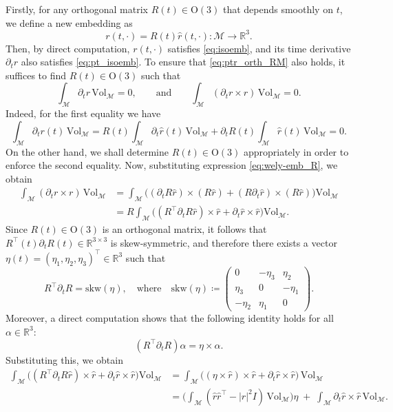 \documentclass[11pt,a4paper,oneside,reqno]{amsart}
\theoremstyle{definition}
\theoremstyle{plain}
\numberwithin{theorem}{section}
\numberwithin{proposition}{section}
\numberwithin{lemma}{section}
\numberwithin{equation}{section}
\newcommand{\Man}{\mathcal{M}}
\newcommand{\Vol}{\mathrm{Vol}}
\begin{document}
Firstly, for any orthogonal matrix $R(t) \in \mathrm{O}(3)$ that depends smoothly on $t$, we define a new embedding as
\begin{equation}\label{eq:wely-emb_R} 
    r(t,\cdot) = R(t)\hat r(t,\cdot) : \Man \to \mathbb{R}^3.
\end{equation} 
Then, by direct computation, $r(t,\cdot)$ satisfies \eqref{eq:isoemb}, and its time derivative $\partial_t r$ also satisfies \eqref{eq:pt_isoemb}.
To ensure that \eqref{eq:ptr_orth_RM} also holds, it suffices to find 
$R(t) \in \mathrm{O}(3)$ such that
\[
    \int_{\Man} \partial_t r \,\Vol_{\Man} = 0,
    \qquad\text{and}\qquad
    \int_{\Man} (\partial_t r \times r)\,\Vol_{\Man} = 0.
\]
Indeed, for the first equality we have 
    \[ \int_{\Man}\partial_t r(t)\,\Vol_{\Man} 
    = R(t) \int_{\Man}  \partial_t \hat r(t)\,\Vol_{\Man} + 
     \partial_t R(t) \int_{\Man}  \hat r(t)\,\Vol_{\Man} = 0. \]
On the other hand, we shall determine $R(t) \in \mathrm{O}(3)$ appropriately in order to enforce the second equality. Now, substituting expression \eqref{eq:wely-emb_R}, we obtain 
\[ \begin{aligned}
    \int_{\Man} (\partial_t r \times r)\,\Vol_{\Man} &= 
    \int_{\Man} \big( (\partial_t R \hat r) \times (R \hat r) + 
    (R \partial_t \hat r) \times (R \hat r)
    \big) \Vol_{\Man} \\ 
    &= R \int_{\Man}((R^{\top}\partial_t R \hat{r} ) \times  \hat{r} + 
    \partial_t \hat r \times \hat{r}    
    \big) \Vol_{\Man}.  
\end{aligned} \]
Since $R(t) \in \mathrm{O}(3)$ is an orthogonal matrix, it follows that 
$R^{\top}(t)\partial_t R(t) \in \mathbb{R}^{3\times 3}$ is skew-symmetric, and therefore 
there exists a vector $\eta(t) = (\eta_1, \eta_2, \eta_3)^{\top} \in \mathbb{R}^3$ such that
\[
    R^{\top}\partial_t R = \mathrm{skw}(\eta), 
    \quad \text{where} \quad
    \mathrm{skw}(\eta) \coloneqq
    \begin{pmatrix}
        0 & -\eta_3 & \eta_2 \\
        \eta_3 & 0 & -\eta_1 \\
        -\eta_2 & \eta_1 & 0
    \end{pmatrix}.
\]
Moreover, a direct computation shows that the following identity holds for all 
$\alpha \in \mathbb{R}^3$:
\begin{equation}\label{eq:skew} 
    (R^{\top}\partial_t R)\alpha = \eta \times \alpha.
\end{equation} 
Substituting this, we obtain
\[
\begin{aligned}
\int_{\Man}((R^{\top}\partial_t R \hat{r} ) \times  \hat{r} + 
    \partial_t \hat r \times \hat{r}    
    \big) \Vol_{\Man}
&= \int_{\Man}\!\big((\eta\times\hat r) \times \hat r +\partial_t\hat r \times \hat r \big)\,\Vol_{\Man} \\
&= \Big(\int_{\Man}\!(\hat r\hat r^{\top} - |\hat r|^2 I)\,\Vol_{\Man}\Big)\eta
\;+\; \int_{\Man}\!\partial_t\hat r \times \hat r\,\Vol_{\Man}.
\end{aligned}
\]
\end{document}
